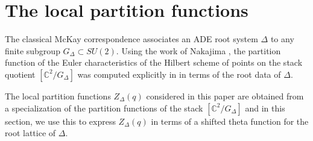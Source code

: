 \documentclass{article}
\theoremstyle{definition}
\newcommand{\CC} {{\mathbb C}}          %
\newcommand{\PP}{\mathbb{P}}
\begin{document}


\begin{comment}
\subsection{Enumerative applications}\label{subsec: enumerative applications}

We have already mentioned above the enumerative application to the CHL
Calabi-Yau threefold $(X\times E)/G$ in the case where $G\subset E$ is
a finite subgroup of an elliptic curve. Another application is the
following generalization of the Yau-Zaslow formula counting rational
curves on $X$.

Let $X\subset \PP^{g}$ be an embedding obtained from a $G$-equivariant
ample line bundle $L$ with $c_{1}(L)$ a primitive class of square
$2g-2$. Then the coefficient of $q^{g-1}$ in $Z_{X,G}(q)$ is the
number of hyperplane sections which are $G$-invariant rational curves,
counted with multiplicity.

\dots add discussion of the above. Formulate as proposition?


\subsection{Structure of the paper}

I'm not sure we really need to outline the paper here, but we could.
\end{comment}

\section{The local partition functions}\label{sec: local partition functions}

The classical McKay correspondence associates an ADE root system
$\Delta$ to any finite subgroup $ G_{\Delta}\subset SU(2)$. Using
the work of Nakajima \cite{nakajima2002geometric}, the partition function of the
Euler characteristics of the Hilbert scheme of points on the stack
quotient $[\CC^{2}/G_{\Delta}]$ was computed explicitly in
\cite{gyenge2015euler} in terms of the root data of $\Delta$.

The local partition functions $Z_{\Delta}(q)$ considered in this paper
are obtained from a specialization of the partition functions of the
stack $[\CC^{2} /G_{\Delta}]$ and in this section, we use this to express
$Z_{\Delta}(q)$ in terms of a shifted theta function for the root
lattice of $\Delta$.
\end{document}
